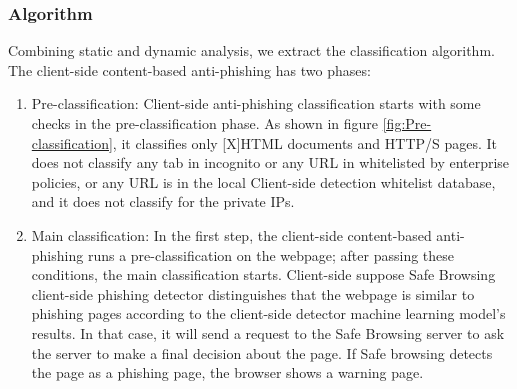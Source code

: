 \documentclass[letterpaper,twocolumn,10pt]{article}
\begin{document}
\subsubsection{Algorithm}

Combining static and dynamic analysis, we extract the classification algorithm. The client-side content-based anti-phishing has two phases:

\begin{enumerate}
    \item Pre-classification: Client-side anti-phishing classification starts with some checks in the pre-classification phase. As shown in figure \ref{fig:Pre-classification}, it classifies only [X]HTML documents and HTTP/S pages. It does not classify any tab in incognito or any  URL in whitelisted by enterprise policies, or any URL is in the local Client-side detection whitelist database, and it does not classify for the private IPs.
    
    \item Main classification: In the first step, the client-side content-based anti-phishing runs a pre-classification on the webpage; after passing these conditions, the main classification starts. Client-side suppose Safe Browsing client-side phishing detector distinguishes that the webpage is similar to phishing pages according to the client-side detector machine learning model's results. In that case, it will send a request to the Safe Browsing server to ask the server to make a final decision about the page. If Safe browsing detects the page as a phishing page, the browser shows a warning page.


\end{enumerate}
\end{document}
